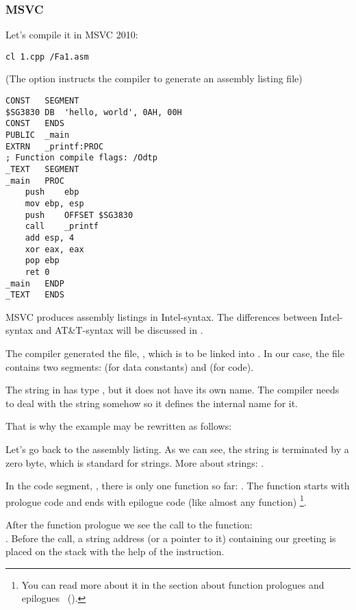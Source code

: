 \subsubsection{MSVC}

Let's compile it in MSVC 2010:

\begin{lstlisting}
cl 1.cpp /Fa1.asm
\end{lstlisting}

(The  option instructs the compiler to generate an assembly listing file)

\begin{lstlisting}[caption=MSVC 2010,style=customasmx86]
CONST	SEGMENT
$SG3830	DB	'hello, world', 0AH, 00H
CONST	ENDS
PUBLIC	_main
EXTRN	_printf:PROC
; Function compile flags: /Odtp
_TEXT	SEGMENT
_main	PROC
	push	ebp
	mov	ebp, esp
	push	OFFSET $SG3830
	call	_printf
	add	esp, 4
	xor	eax, eax
	pop	ebp
	ret	0
_main	ENDP
_TEXT	ENDS
\end{lstlisting}

MSVC produces assembly listings in Intel-syntax.
The differences between Intel-syntax and AT\&T-syntax will be discussed in .

The compiler generated the file, , which is to be linked into .
In our case, the file contains two segments:  (for data constants) and  (for code).

\label{string_is_const_char}
The string  in \CCpp has type , but it does not have its own name.
The compiler needs to deal with the string somehow so it defines the internal name  for it.

That is why the example may be rewritten as follows:



Let's go back to the assembly listing. As we can see, the string is terminated by a zero byte, which is standard for \CCpp strings.
More about \CCpp strings: .

In the code segment, , there is only one function so far: \main{}.
The function \main starts with prologue code and ends with epilogue code (like almost any function)
\footnote{You can read more about it in the section about function prologues and epilogues ~().}.

After the function prologue we see the call to the \printf{} function:\\
.
Before the call, a string address (or a pointer to it) containing our greeting is placed on the stack with the help of the \PUSH instruction.

